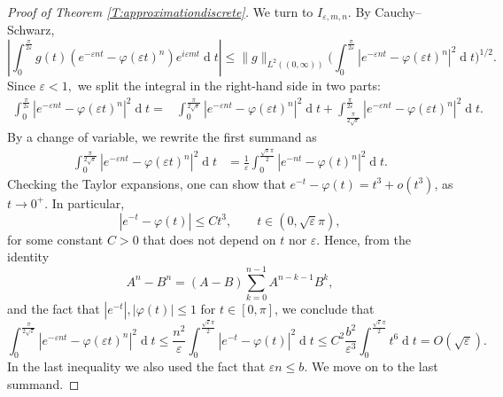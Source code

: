 \documentclass[12pt,a4paper,reqno]{amsart}
\theoremstyle{definition}
\theoremstyle{definition}\newtheorem{defn}[thm]{Definition}
\begin{document}
\begin{proof}[Proof of Theorem \ref{T:approximationdiscrete}]
    We turn to $I_{\varepsilon,m,n}$.  By Cauchy--Schwarz,
    \[
    \left|\int_0^{\frac{\pi}{2\varepsilon}}
    g(t)
    (
    e^{-\varepsilon nt}-\varphi(\varepsilon t)^n
    )e^{i\varepsilon mt}\operatorname{d}\!t\right|
    \leqslant
    \|g\|_{L^2((0,\infty))}
    \Big(
    \int_0^{\frac{\pi}{2\varepsilon}}
    |e^{-\varepsilon nt}
    -\varphi(\varepsilon t)^n
    |^2
    \operatorname{d}\!t
    \Big)^{1/2}.
    \]
    Since $\varepsilon<1,$ we split the integral in the right-hand side in two parts:
    \begin{align*}
        \int_0^{\frac{\pi}{2\varepsilon}}
    |e^{-\varepsilon nt}
    -\varphi(\varepsilon t)^n
    |^2
    \operatorname{d}\!t=&
    \int_0^{\frac{\pi}{2\sqrt\varepsilon}} |e^{-\varepsilon nt}-\varphi(\varepsilon t)^n|^2\operatorname{d}\!t +\int_{\frac{\pi}{2\sqrt\varepsilon}}^{\frac{\pi}{2\varepsilon}}
    |e^{-\varepsilon nt}
    -\varphi(\varepsilon t)^n
    |^2
    \operatorname{d}\!t.
    \end{align*}
    By a change of variable, we rewrite the first summand as
    \begin{align*}
    \int_0^{\frac{\pi}{2\sqrt\varepsilon}} |e^{-\varepsilon nt}-\varphi(\varepsilon t)^n|^2\operatorname{d}\!t&=\frac1\varepsilon\int_0^{\frac{\sqrt\varepsilon\pi}{2}} |e^{- nt}-\varphi(t)^n|^2\operatorname{d}\!t.
    \end{align*}
    Checking the Taylor expansions, one can show that $e^{-t}-\varphi(t)=t^3+o(t^3)$, as $t\to 0^+$. In particular, 
    \[
    |e^{-t}-\varphi(t)|\leqslant Ct^3, \qquad t\in(0,\sqrt{\varepsilon}\pi),
    \]
    for some constant $C>0$ that does not depend on $t$ nor $\varepsilon$. 
    Hence, from the identity
    \[
    A^n-B^n=(A-B)\sum_{k=0}^{n-1} A^{n-k-1}B^k,
    \]
    and the fact that $|e^{-t}|,|\varphi(t)|\leqslant 1$ for $t\in [0,\pi]$, we conclude that
    \begin{equation}\label{eq:I_main}
    \int_0^{\frac{\pi}{2\sqrt\varepsilon}} |e^{-\varepsilon nt}-\varphi(\varepsilon t)^n|^2\operatorname{d}\!t\leqslant \frac{n^2}{\varepsilon}\int_0^{\frac{\sqrt\varepsilon\pi}{2}}|e^{-t}-\varphi(t)|^2\operatorname{ d}\! t\leqslant C^2\frac{b^2}{\varepsilon^3}\int_0^{\frac{\sqrt\varepsilon\pi}{2}}t^6\operatorname{d}\!t =O(\sqrt{\varepsilon}).
    \end{equation}
    In the last inequality we also used the fact that $\varepsilon n\leqslant b$. We move on to the last summand.
    

\end{proof}
\end{document}
